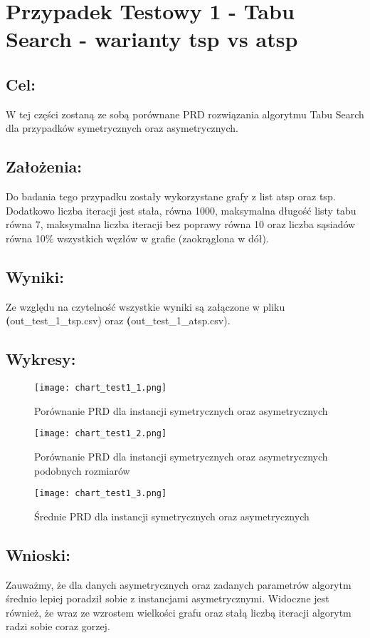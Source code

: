 \section{Przypadek Testowy 1 - Tabu Search - warianty tsp vs atsp}
  \subsection{Cel:}
    W tej części zostaną ze sobą porównane PRD rozwiązania algorytmu Tabu Search dla przypadków symetrycznych oraz asymetrycznych.
    \subsection{Założenia:}
    Do badania tego przypadku zostały wykorzystane grafy z list atsp oraz tsp. Dodatkowo liczba iteracji jest stała, równa 1000, maksymalna długość listy tabu równa 7, maksymalna liczba iteracji bez poprawy równa 10 oraz liczba sąsiadów równa 10\% wszystkich węzłów w grafie (zaokrąglona w dół).
  \subsection{Wyniki: }
  Ze względu na czytelność wszystkie wyniki są załączone w pliku \textbf(out\_test\_1\_tsp.csv) oraz \textbf(out\_test\_1\_atsp.csv).
  \subsection{Wykresy: }
    \begin{figure}[H]
      \texttt{[image: chart\_test1\_1.png]}
      \centering
      \caption{Porównanie PRD dla instancji symetrycznych oraz asymetrycznych}
    \end{figure}
    \begin{figure}[H]
      \texttt{[image: chart\_test1\_2.png]}
      \centering
      \caption{Porównanie PRD dla instancji symetrycznych oraz asymetrycznych podobnych rozmiarów}
    \end{figure}
    \begin{figure}[H]
      \texttt{[image: chart\_test1\_3.png]}
      \centering
      \caption{Średnie PRD dla instancji symetrycznych oraz asymetrycznych}
    \end{figure}

  \subsection{Wnioski: }
    Zauważmy, że dla danych asymetrycznych oraz zadanych parametrów algorytm średnio lepiej poradził sobie z instancjami asymetrycznymi. Widoczne jest również, że wraz ze wzrostem wielkości grafu oraz stałą liczbą iteracji algorytm radzi sobie coraz gorzej.

